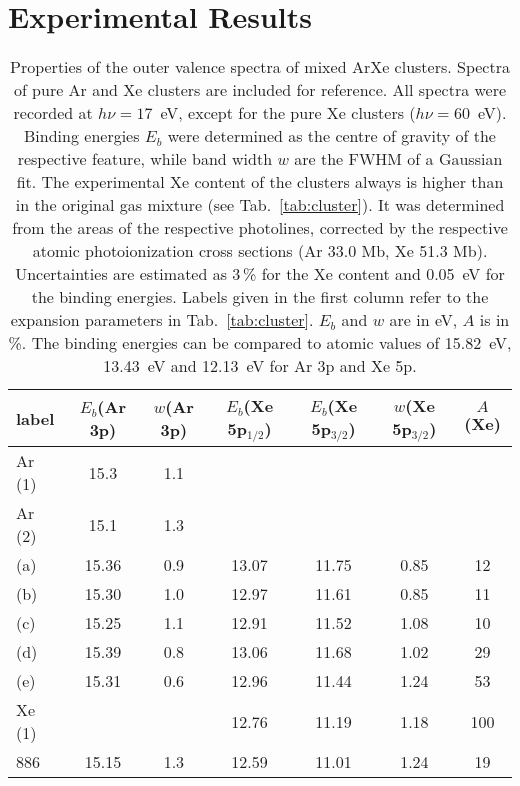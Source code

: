 \section{Experimental Results}


\begin{table}
\caption{Properties of the outer valence spectra of mixed ArXe clusters. Spectra of pure Ar and Xe clusters are included for reference. All spectra were recorded at $h\nu = 17$~eV, except for the pure Xe clusters ($h\nu = 60$~eV). Binding energies $E_b$ were determined as the centre of gravity of the respective feature, while band width $w$ are the FWHM of a Gaussian fit. The experimental Xe content of the clusters always is higher than in the original gas mixture (see Tab.\ \protect\ref{tab:cluster}). It was determined from the areas of the respective photolines, corrected by the respective atomic photoionization cross sections (Ar 33.0 Mb, Xe 51.3 Mb)\cite{samson2002}. Uncertainties are estimated as 3\,\% for the Xe content and 0.05~eV for the binding energies. Labels given in the first column refer to the expansion parameters in Tab.\ \protect\ref{tab:cluster}. $E_b$ and $w$ are in eV, $A$ is in \%. The binding energies can be compared to atomic values of 15.82~eV, 13.43~eV and 12.13~eV for Ar 3p and Xe 5p.
\label{tab:valence} }
\begin{tabular}{ l c c c c c c}
%
\toprule
  label & $E_b$(Ar 3p) & $w$(Ar 3p) & $E_b$(Xe 5p$_{1/2}$) &  $E_b$(Xe 5p$_{3/2}$) & $w$(Xe 5p$_{3/2}$)  &  $A$(Xe) \\
%
\midrule
 Ar (1) &  15.3  &  1.1 & & & &  \\
 Ar (2) &  15.1  &  1.3 & & & &  \\
%
 (a) & 15.36 & 0.9 & 13.07 & 11.75 & 0.85 & 12\\
 (b) & 15.30 & 1.0 & 12.97 & 11.61 & 0.85 & 11\\
 (c) & 15.25 & 1.1 & 12.91 & 11.52 & 1.08 & 10\\
 (d) & 15.39 & 0.8 & 13.06 & 11.68 & 1.02 & 29\\
 (e) & 15.31 & 0.6 & 12.96 & 11.44 & 1.24 & 53\\
Xe (1) & & & 12.76 & 11.19 & 1.18 & 100\\
%
\midrule
%
 886 & 15.15 & 1.3 & 12.59 & 11.01 & 1.24 & 19\\
\bottomrule
\end{tabular}
\end{table}
